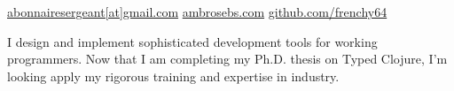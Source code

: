 \documentclass[10pt,a4paper]{article}
\begin{document}
\sloppy  %



\nobreakvspace{0.3em}  %

\noindent\href{mailto:abonnairesergeant.at.gmail.dot.com}{abonnairesergeant\mbox{}[at]\mbox{}gmail.com}\sbull
\href{http://ambrosebs.com/}{ambrosebs.com}\sbull
\href{https://github.com/frenchy64}{github.com/frenchy64}




I design and implement sophisticated development tools for working programmers.
%
%
Now that I am completing my
Ph.D. thesis on Typed Clojure, %
I'm looking apply my rigorous training and expertise
in industry.

\end{document}
